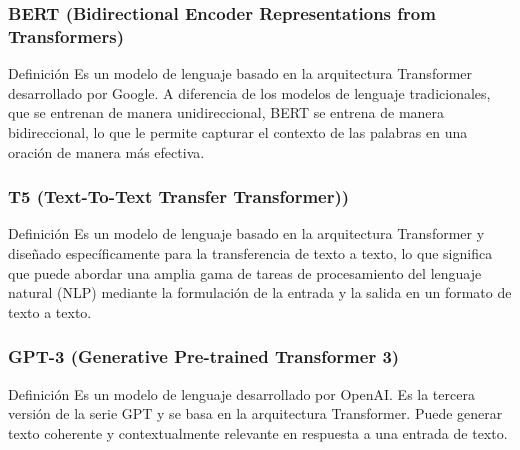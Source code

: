 \documentclass[
11pt, %
%
aspectratio=169, %
]{beamer}
\begin{document}
	\begin{frame}
		\frametitle{BERT (Bidirectional Encoder Representations from Transformers)}
		
		\begin{block}{Definici\'on}
			Es un modelo de lenguaje basado en la arquitectura Transformer desarrollado por Google. A diferencia de los modelos de lenguaje tradicionales, que se entrenan de manera unidireccional, BERT se entrena de manera bidireccional, lo que le permite capturar el contexto de las palabras en una oración de manera más efectiva.
		\end{block}
		
		
	\end{frame}
	
	
	\begin{frame}
		\frametitle{T5 (Text-To-Text Transfer Transformer))}
		\begin{block}{Definici\'on}
			Es un modelo de lenguaje basado en la arquitectura Transformer y diseñado específicamente para la transferencia de texto a texto, lo que significa que puede abordar una amplia gama de tareas de procesamiento del lenguaje natural (NLP) mediante la formulación de la entrada y la salida en un formato de texto a texto.
		\end{block}
	
	\end{frame}
	\begin{frame}
		\frametitle{GPT-3 (Generative Pre-trained Transformer 3)}
		
		\begin{block}{Definici\'on}
			Es un modelo de lenguaje desarrollado por OpenAI. Es la tercera versión de la serie GPT y se basa en la arquitectura Transformer. Puede generar texto coherente y contextualmente relevante en respuesta a una entrada de texto.
		\end{block}
		
		
	\end{frame}
\end{document}
